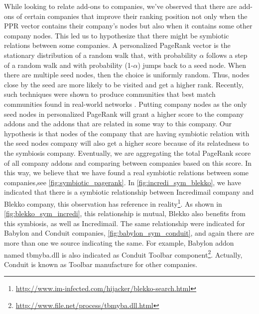 \documentclass[11pt,oneside]{book}
\begin{document}
While looking to relate add-ons to companies, we've observed that there are add-ons of certain companies that improve their ranking position not only when the PPR vector contains their company's nodes but also when it contains some other company nodes. This led us to hypothesize that there might be symbiotic relations between some companies.
A personalized PageRank vector is the stationary distribution of a random walk that, with probability $\alpha$ follows a step of a random walk and with probability (1-$\alpha$) jumps back to a seed node. When there are multiple seed nodes, then the choice is uniformly random. Thus, nodes close by the seed are more likely to be visited and get a higher rank. Recently, such techniques were shown to produce communities that best match communities found in real-world networks \citep{abrahao2012separability}. Putting company nodes as the only seed nodes in personalized PageRank will grant a higher score to the company addons and the addons that are related in some way to this company. Our hypothesis is that nodes of the company that are having symbiotic relation with the seed nodes company will also get a higher score because of its relatedness to the symbiosis company.
Eventually, we are aggregating the total PageRank score of all company addons and comparing between companies based on this score.
In this way, we believe that we have found a real symbiotic relations between some companies,see \autoref{fig:symbiotic_pagerank}.
In \autoref{fig:incredi_sym_blekko}, we have indicated that there is a symbiotic relationship between Incredimail company and Blekko company, this observation has reference in reality\footnote{\url{http://www.im-infected.com/hijacker/blekko-search.html}}. As shown in \autoref{fig:blekko_sym_incredi}, this relationship is mutual, Blekko also benefits from this symbiosis, as well as Incredimail. The same relationship were indicated for Babylon and Conduit companies, \autoref{fig:babylon_sym_conduit}, and again there are more than one we source indicating the same. For example, Babylon addon named tbmyba.dll is also indicated as Conduit Toolbar component\footnote{\url{http://www.file.net/process/tbmyba.dll.html}}. Actually, Conduit is known as Toolbar manufacture for other companies.
\end{document}
